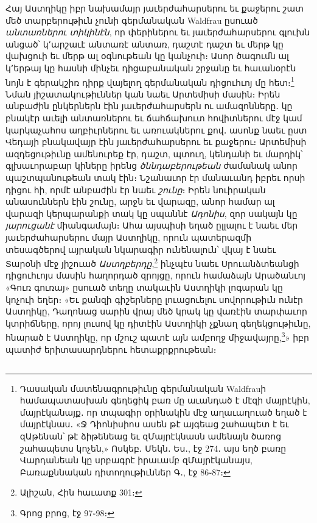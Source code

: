 \documentclass{article}
\begin{document}
{Հայ Աստղիկը իբր նախամայր յաւերժահարսերու եւ քաջերու շատ մեծ տարբերութիւն չունի գերմանական Waldfrau ըսուած \emph{անտառներու տիկինէն}, որ փերիներու եւ յաւերժահարսերու գլուխն անցած՝ կ՚արշաւէ անտառէ անտառ, դաշտէ դաշտ եւ մերթ կը վախցուի եւ մերթ ալ օգնութեան կը կանչուի։ Ասոր ծագումն ալ կ՚երթայ կը հասնի մինչեւ դիցաբանական շրջանը եւ հաւանօրէն նոյն է գերակշիռ դիրք վայելող գերմանական դիցուհւոյ մը հետ։\footnote{Դասական մատենագրութիւնը գերմանական Waldfrauի համապատասխան գեղեցիկ բառ մը աւանդած է մէզի մայրէկին, մայրէկանայք․ որ տպագիր օրինակին մէջ աղաւաղուած եղած է մայրէկնաս․ «Ջ Դիոնիսիոս ասեն թէ այգեաց շահապետ է եւ զԱթենան՝ թէ ձիթենեաց եւ զՄայրէկնասն ամենայն ծառոց շահապետս կոչեն,» Ոսկեբ․ Մեկն․ Ես․, էջ 274․ այս եղծ բառը Վարդանեան կը սրբագրէ իրաւամբ զՄայրէկանայս, Բառաքննական դիտողութիւններ Գ․, էջ 86֊87։} Նման յիշատակութիւններ կան նաեւ Արտեմիսի մասին։ Իրեն անբաժին ընկերներն էին յաւերժահարսերն ու ամազոնները․ կը բնակէր աւելի անտառներու եւ ճահճախուտ հովիտներու մէջ կամ կարկաչահոս աղբիւրներու եւ առուակներու քով․ ասոնք նաեւ ըստ Վեդայի բնակավայր էին յաւերժահարսերու եւ քաջերու։ Արտեմիսի ազդեցութիւնը ամենուրեք էր, դաշտ, պտուղ, կենդանի եւ մարդիկ՝ գլխաւորաբար կիները իրենց \emph{ծննդաբերութեան} ժամանակ անոր պաշտպանութեան տակ էին։ Նշանաւոր էր մանաւանդ իբրեւ որսի դիցու հի, որմէ անբաժին էր նաեւ \emph{շունը}։ Իրեն նուիրական անասուններն էին շունը, արջն եւ վարազը, անոր համար ալ վարազի կերպարանքի տակ կը սպաննէ \emph{Ադոնիս}, զոր սակայն կը \emph{յարուցանէ} միանգամայն։ Ահա այսպիսի եղած ըլլալու է նաեւ մեր յաւերժահարսերու մայր Աստղիկը, որուն պատերազմի տեսագծերով այրական նկարագիր ունենալուն՝ վկայ է նաեւ Տարօնի մէջ յիշուած \emph{Աստղբերդը},\footnote{Ալիշան, Հին հաւատք 301։} ինչպէս նաեւ Սրուանձտեանցի դիցուհւոյս մասին հաղորդած զրոյցը, որուն համաձայն Արածանւոյ «Գուռ գուռայ» ըսուած տեղը տակաւին Աստղիկի լոգարան կը կոչուի եղեր։ «Եւ քանզի գիշերները լուացուելու սովորութիւն ունէր Աստղիկը, Դաղոնաց սարին վրայ մեծ կրակ կը վառէին տարփաւոր կտրիճները, որոյ լուսով կը դիտէին Աստղիկի չքնաղ գեղեկցութիւնը, հնարած է Աստղիկը, որ մշուշ պատէ այն ամբողջ միջավայրը,\footnote{Գրոց բրոց, էջ 97֊98։}» իբր պատիժ երիտասարդներու հետաքրքրութեան։}
\clearpage
\subsection{}
\end{document}
